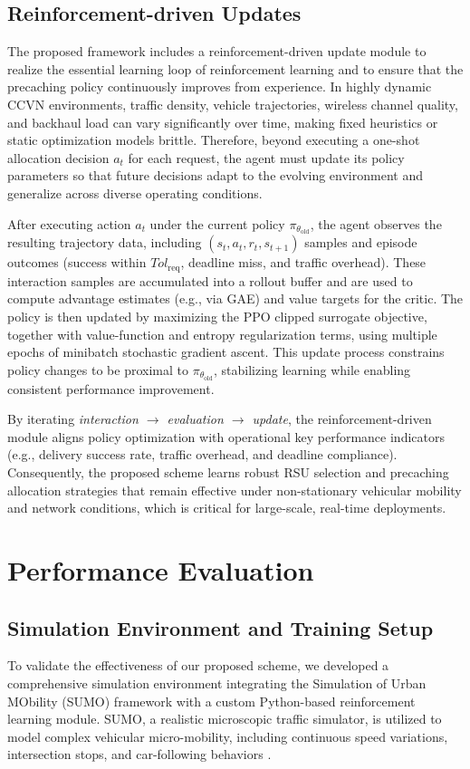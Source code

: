 \subsection{Reinforcement-driven Updates}
\label{subsec:rl_updates}
The proposed framework includes a reinforcement-driven update module to realize the essential learning loop of reinforcement learning and to ensure that the precaching policy continuously improves from experience. 
In highly dynamic CCVN environments, traffic density, vehicle trajectories, wireless channel quality, and backhaul load can vary significantly over time, making fixed heuristics or static optimization models brittle. 
Therefore, beyond executing a one-shot allocation decision $a_t$ for each request, the agent must update its policy parameters so that future decisions adapt to the evolving environment and generalize across diverse operating conditions.

After executing action $a_t$ under the current policy $\pi_{\theta_{\text{old}}}$, the agent observes the resulting trajectory data, including $(s_t,a_t,r_t,s_{t+1})$ samples and episode outcomes (success within $Tol_{\mathrm{req}}$, deadline miss, and traffic overhead). 
These interaction samples are accumulated into a rollout buffer and are used to compute advantage estimates (e.g., via GAE) and value targets for the critic. 
The policy is then updated by maximizing the PPO clipped surrogate objective, together with value-function and entropy regularization terms, using multiple epochs of minibatch stochastic gradient ascent. 
This update process constrains policy changes to be proximal to $\pi_{\theta_{\text{old}}}$, stabilizing learning while enabling consistent performance improvement.

By iterating \emph{interaction $\rightarrow$ evaluation $\rightarrow$ update}, the reinforcement-driven module aligns policy optimization with operational key performance indicators (e.g., delivery success rate, traffic overhead, and deadline compliance). 
Consequently, the proposed scheme learns robust RSU selection and precaching allocation strategies that remain effective under non-stationary vehicular mobility and network conditions, which is critical for large-scale, real-time deployments.

\section{Performance Evaluation} \label{sec.pe}

\subsection{Simulation Environment and Training Setup}
To validate the effectiveness of our proposed scheme, we developed a comprehensive simulation environment integrating the Simulation of Urban MObility (SUMO) framework with a custom Python-based reinforcement learning module. SUMO, a realistic microscopic traffic simulator, is utilized to model complex vehicular micro-mobility, including continuous speed variations, intersection stops, and car-following behaviors \cite{SUMO}.


